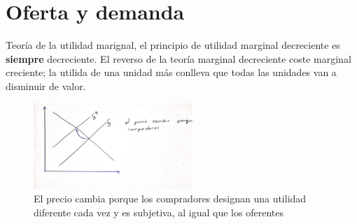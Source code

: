 \section{Oferta y demanda}
Teoría de la utilidad marignal, el principio de utilidad marginal decreciente es \textbf{siempre} decreciente. El reverso de la teoría marginal decreciente coste marginal creciente; la utilida de una unidad más conlleva que todas las unidades van a disminuir de valor.
\begin{center}
    \begin{figure}[htbp]
        \centering
        \includegraphics[width=6cm,angle=90]{Classes/Images/2019-07-24-3.jpg}
        \caption{El precio cambia porque los compradores designan una utilidad diferente cada vez y es subjetiva, al igual que los oferentes}
        \label{fig3}
    \end{figure}
\end{center}


